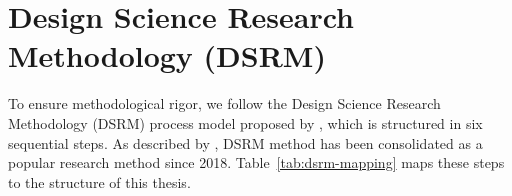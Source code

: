 \section{Design Science Research Methodology (DSRM)}
\label{sec:dsrm-process}

To ensure methodological rigor, we follow the Design Science Research Methodology (DSRM) process model proposed by , which is structured in six sequential steps. As described by \cite{pimentel_2020}, DSRM method has been consolidated as a popular research method since 2018. Table~\ref{tab:dsrm-mapping} maps these steps to the structure of this thesis.

